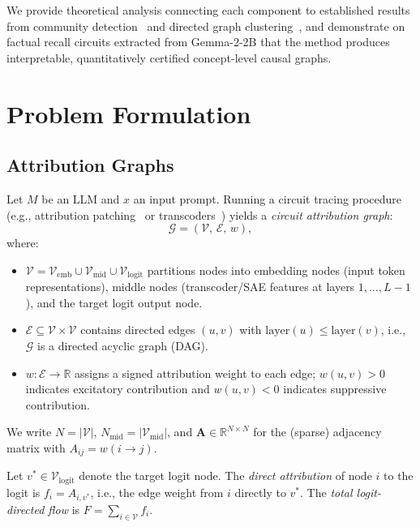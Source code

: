 \documentclass[11pt]{article}
\newcommand{\cG}{\mathcal{G}}
\newcommand{\cV}{\mathcal{V}}
\newcommand{\cE}{\mathcal{E}}
\newcommand{\bA}{\mathbf{A}}
\newcommand{\R}{\mathbb{R}}
\newcommand{\1}{\mathbbm{1}}
\begin{document}
We provide theoretical analysis connecting each component to established results from community detection~\citep{abbe2018community} and directed graph clustering~\citep{rohe2016co}, and demonstrate on factual recall circuits extracted from Gemma-2-2B that the method produces interpretable, quantitatively certified concept-level causal graphs.

\section{Problem Formulation}
\label{sec:problem}

\subsection{Attribution Graphs}
\label{sec:attr-graph}

Let $M$ be an LLM and $x$ an input prompt.
Running a circuit tracing procedure (e.g., attribution patching~\citep{meng2022locating} or transcoders~\citep{templeton2024scaling}) yields a \emph{circuit attribution graph}:
\[
  \cG = (\cV,\, \cE,\, w),
\]
where:
\begin{itemize}[leftmargin=2em]
  \item $\cV = \cV_{\mathrm{emb}} \cup \cV_{\mathrm{mid}} \cup \cV_{\mathrm{logit}}$ partitions nodes into embedding nodes (input token representations), middle nodes (transcoder/SAE features at layers $1,\ldots,L-1$), and the target logit output node.
  \item $\cE \subseteq \cV \times \cV$ contains directed edges $(u,v)$ with $\mathrm{layer}(u) \le \mathrm{layer}(v)$, i.e., $\cG$ is a directed acyclic graph (DAG).
  \item $w: \cE \to \R$ assigns a signed attribution weight to each edge; $w(u,v) > 0$ indicates excitatory contribution and $w(u,v) < 0$ indicates suppressive contribution.
\end{itemize}

We write $N = |\cV|$, $N_{\mathrm{mid}} = |\cV_{\mathrm{mid}}|$, and $\bA \in \R^{N \times N}$ for the (sparse) adjacency matrix with $A_{ij} = w(i \to j)$.

Let $v^* \in \cV_{\mathrm{logit}}$ denote the target logit node.
The \emph{direct attribution} of node $i$ to the logit is $f_i = A_{i,v^*}$, i.e., the edge weight from $i$ directly to $v^*$.
The \emph{total logit-directed flow} is $F = \sum_{i \in \cV} f_i$.
\end{document}
